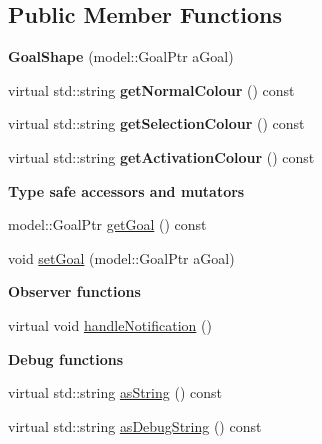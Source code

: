 \subsection*{Public Member Functions}
\begin{DoxyCompactItemize}
\item 
{\bfseries Goal\+Shape} (model\+::\+Goal\+Ptr a\+Goal)\hypertarget{class_view_1_1_goal_shape_ac2dc0283bbdefcc5886f985f04611ffb}{}\label{class_view_1_1_goal_shape_ac2dc0283bbdefcc5886f985f04611ffb}

\item 
virtual std\+::string {\bfseries get\+Normal\+Colour} () const \hypertarget{class_view_1_1_goal_shape_a31a8bb188f7870024c168529e8788673}{}\label{class_view_1_1_goal_shape_a31a8bb188f7870024c168529e8788673}

\item 
virtual std\+::string {\bfseries get\+Selection\+Colour} () const \hypertarget{class_view_1_1_goal_shape_a9b0b0c7aa41bfe75723e847a4a57173e}{}\label{class_view_1_1_goal_shape_a9b0b0c7aa41bfe75723e847a4a57173e}

\item 
virtual std\+::string {\bfseries get\+Activation\+Colour} () const \hypertarget{class_view_1_1_goal_shape_a5f3f650fd43dc5ba30518deec6859506}{}\label{class_view_1_1_goal_shape_a5f3f650fd43dc5ba30518deec6859506}

\end{DoxyCompactItemize}
\begin{Indent}{\bf Type safe accessors and mutators}\par
\begin{DoxyCompactItemize}
\item 
model\+::\+Goal\+Ptr \hyperlink{class_view_1_1_goal_shape_a8c0c1cce167a4e8a0cf085f676c213a0}{get\+Goal} () const
\item 
void \hyperlink{class_view_1_1_goal_shape_a2e8149d939f204e0cc0efc2488af8fb2}{set\+Goal} (model\+::\+Goal\+Ptr a\+Goal)
\end{DoxyCompactItemize}
\end{Indent}
\begin{Indent}{\bf Observer functions}\par
\begin{DoxyCompactItemize}
\item 
virtual void \hyperlink{class_view_1_1_goal_shape_a881cfbfd4b3d6d3b37498e12d8291f6f}{handle\+Notification} ()
\end{DoxyCompactItemize}
\end{Indent}
\begin{Indent}{\bf Debug functions}\par
\begin{DoxyCompactItemize}
\item 
virtual std\+::string \hyperlink{class_view_1_1_goal_shape_a7f6c2c9c9502d264657a0b688e3d5e86}{as\+String} () const 
\item 
virtual std\+::string \hyperlink{class_view_1_1_goal_shape_a7d88c0780ae52278bacb44f4a6c79da5}{as\+Debug\+String} () const 
\end{DoxyCompactItemize}
\end{Indent}
